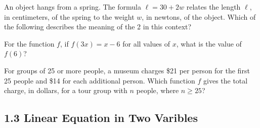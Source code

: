 \vspace{2em}
\newpage
\noindent\markforreview

\vspace{1em}

An object hangs from a spring. The formula \( \ell = 30 + 2w \) relates the length \( \ell \), in centimeters, of the spring to the weight \( w \), in newtons, of the object. Which of the following describes the meaning of the 2 in this context?

\vspace{0.75em}



\vspace{2em}
\noindent\markforreview

\vspace{1em}

For the function \( f \), if \( f(3x) = x - 6 \) for all values of \( x \), what is the value of \( f(6) \)?

\vspace{0.75em}




\newpage
\noindent\markforreview

\vspace{1em}

For groups of 25 or more people, a museum charges \$21 per person for the first 25 people and \$14 for each additional person. Which function \( f \) gives the total charge, in dollars, for a tour group with \( n \) people, where \( n \geq 25 \)?

\vspace{0.75em}



\newpage

\subsection*{1.3 Linear Equation in Two Varibles}

